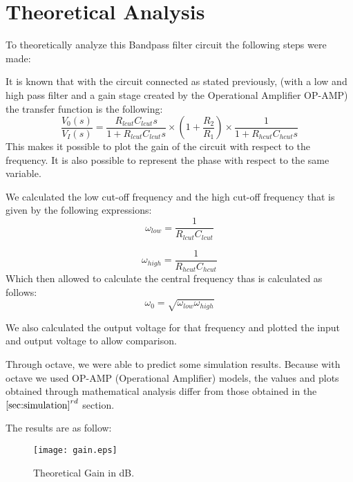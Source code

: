 
\section{Theoretical Analysis}
\label{sec:analysis}

To theoretically analyze this Bandpass filter circuit the following steps were made:
\par
\par
It is known that with the circuit connected as stated previously, (with a low and high pass filter and a gain stage created by the Operational Amplifier OP-AMP) the transfer function is the following:
\begin{equation}
    \dfrac{V_0(s)}{V_I(s)} = \dfrac{R_{lcut} C_{lcut} s}{1+R_{lcut} C_{lcut} s}\times \left( 1+\dfrac{R_2}{R_1} \right) \times \dfrac{1}{1+R_{hcut} C_{hcut} s}
\end{equation}
This makes it possible to plot the gain of the circuit with respect to the frequency. It is also possible to represent the phase with respect to the same variable.
\par
\par

We calculated the low cut-off frequency and the high cut-off frequency that is given by the following expressions:
\begin{equation}
    \omega_{low} = \dfrac{1}{R_{lcut} C_{lcut}}
\end{equation}

\begin{equation}
    \omega_{high} = \dfrac{1}{R_{hcut} C_{hcut}}
\end{equation}
Which then allowed to calculate the central frequency thas is calculated as follows:
\begin{equation}
    \omega_{0} = \sqrt{\omega_{low} \omega_{high}}
\end{equation}

We also calculated the output voltage for that frequency and plotted the input and output voltage to allow comparison.

Through octave, we were able to predict some simulation results. Because with octave we used OP-AMP (Operational Amplifier)  models, the values and plots obtained through mathematical analysis differ from those obtained in the $\ref{sec:simulation}^{rd}$ section.

The results are as follow:

\begin{figure}[h] 
\centering
\texttt{[image: gain.eps]}
\caption{Theoretical Gain in dB.}
\label{Fig2: TheoGaindB}
\end{figure}

